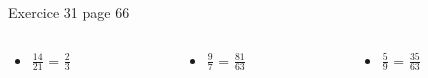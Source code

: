\documentclass[xcolor={dvipsnames}, handout]{beamer}
\begin{document}
\begin{frame}
	
	\begin{block}{Exercice 31 page 66}
		
	\begin{columns}
		\begin{column}{0.25\textwidth}
			\begin{huge}
				\begin{itemize}
					\item $\frac{14}{21}$ = \pause $\frac{2}{3}$ \pause
					
					
					
					
				\end{itemize}	
			\end{huge}
			
		\end{column}
		
		\begin{column}{0.25\textwidth}
			\begin{huge}
				\begin{itemize}
					
					
					\item $\frac{9}{7}$ = \pause $\frac{81}{63}$\pause
					
					
					
				\end{itemize}	
			\end{huge}
			
		\end{column}
	
		\begin{column}{0.25\textwidth}
			\begin{huge}
				\begin{itemize}
					\item $\frac{5}{9}$ = \pause $\frac{35}{63}$\pause
					
				\end{itemize}	
			\end{huge}
			
		\end{column}
	

\end{columns}
\end{block}
\end{frame}
\end{document}
